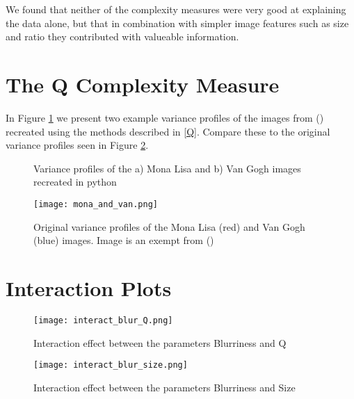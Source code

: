 \documentclass[12pt]{article}
\begin{document}
We found that neither of the complexity measures were very good at explaining the data alone, but that in combination with simpler image features such as size and ratio they contributed with valueable information.

\clearpage

\appendix
\section{The Q Complexity Measure}\label{AQ}
In Figure \ref{fig:Qrecreated} we present two example variance profiles of the images from (\cite{zanetteQuantifyingComplexityBlackandwhite2018}) recreated using the methods described in \ref{Q}. Compare these to the original variance profiles seen in Figure \ref{fig:monalisa}.

\begin{figure}[h]
	\centering
	\hfill
	\caption{Variance profiles of the a) Mona Lisa and b) Van Gogh images recreated in python} 
	\label{fig:Qrecreated}
\end{figure}

\begin{figure}[h]
	\begin{center}
		\texttt{[image: mona\_and\_van.png]}
	\end{center}
	\caption{Original variance profiles of the Mona Lisa (red) and Van Gogh (blue) images. Image is an exempt from (\cite{zanetteQuantifyingComplexityBlackandwhite2018})}
	\label{fig:monalisa}
\end{figure}

\section{Interaction Plots}\label{Ainteraction}

\begin{figure}[h]
	\begin{center}
		\texttt{[image: interact\_blur\_Q.png]}
	\end{center}
	\caption{Interaction effect between the parameters Blurriness and Q}
	\label{fig:interact_blur_Q}
\end{figure}

\begin{figure}[h]
	\begin{center}
		\texttt{[image: interact\_blur\_size.png]}
	\end{center}
	\caption{Interaction effect between the parameters Blurriness and Size}
	\label{fig:interact_blur_size}
\end{figure}
\end{document}
